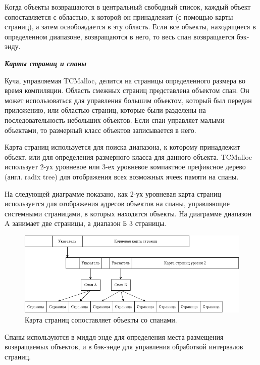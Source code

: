Когда объекты возвращаются в центральный свободный список, каждый объект сопоставляется с областью, к которой он принадлежит (с помощью карты страниц), а затем освобождается в эту область. Если все объекты, находящиеся в определенном диапазоне, возвращаются в него, то весь спан возвращается бэк-энду.

\bigbreak
\textit{\textbf{Карты страниц и спаны}}

Куча, управляемая TCMalloc, делится на страницы определенного размера во время компиляции. Область смежных страниц представлена объектом спан. Он может использоваться для управления большим объектом, который был передан приложению, или областью страниц, которые были разделены на последовательность небольших объектов. Если спан управляет малыми объектами, то размерный класс объектов записывается в него.

Карта страниц используется для поиска диапазона, к которому принадлежит объект, или для определения размерного класса для данного объекта. TCMalloc использует 2-ух уровневое или 3-ех уровневое компактное префиксное дерево (англ. radix tree) для отображения всех возможных ячеек памяти на спаны.

На следующей диаграмме показано, как 2-ух уровневая карта страниц используется для отображения адресов объектов на спаны, управляющие системными страницами, в которых находятся объекты. На диаграмме диапазон A занимает две страницы, а диапазон Б 3 страницы.

\begin{figure}[!h]
	\begin{center}
		\includegraphics[scale=0.6]{images/tcmalloc-pagemap-and-spans.png}
		\caption{Карта страниц сопоставляет объекты со спанами.}
		\label{tcmalloc-pagemap-and-spans}
	\end{center}
\end{figure}

Спаны используются в миддл-энде для определения места размещения возвращаемых объектов, и в бэк-энде для управления обработкой интервалов страниц.


